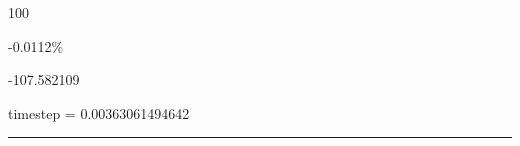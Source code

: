\noindent\parbox[t]{0.05\linewidth}{\centering\strut 100}\hspace{0.006\linewidth}\parbox[t]{0.04\linewidth}{\centering\strut {}}\hspace{0.006\linewidth}\parbox[t]{0.10\linewidth}{\centering\strut -0.0112\%}\hspace{0.006\linewidth}\parbox[t]{0.115\linewidth}{\centering\strut -107.582109}\hspace{0.006\linewidth}\parbox[t]{0.671\linewidth}{timestep = 0.00363061494642}\par\smallskip
\noindent\rule{\linewidth}{0.5pt}
\par\medskip
